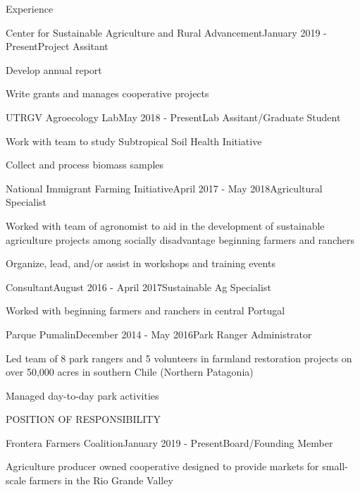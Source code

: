 \documentclass{resume} %
\begin{document}
\begin{rSection}{Experience}

\begin{rSubsection}{Center for Sustainable Agriculture and Rural Advancement}{January 2019 - Present}{Project Assitant}{}
\item Develop annual report
\item Write grants and manages cooperative projects
\end{rSubsection}



\begin{rSubsection}{UTRGV Agroecology Lab}{May 2018 - Present}{Lab Assitant/Graduate Student}{}
\item Work with team to study Subtropical Soil Health Initiative
\item Collect and process biomass samples
\end{rSubsection}

\begin{rSubsection}{National Immigrant Farming Initiative}{April 2017 - May 2018}{Agricultural Specialist}{}
\item Worked with team of agronomist to aid in the development of sustainable agriculture projects among socially disadvantage beginning farmers and ranchers
\item Organize, lead, and/or assist in workshops and training events
\end{rSubsection}

\begin{rSubsection}{Consultant}{August 2016 - April 2017}{Sustainable Ag Specialist}
\item Worked with beginning farmers and ranchers in central Portugal 
\end{rSubsection}


\begin{rSubsection}{Parque Pumalin}{December 2014 - May 2016}{Park Ranger Administrator}{}
\item Led team of 8 park rangers and 5 volunteers in farmland restoration projects on over 50,000 acres in southern Chile (Northern Patagonia)
\item Managed day-to-day park activities 
\end{rSubsection}

\end{rSection}


\begin{rSection}{POSITION OF RESPONSIBILITY}

\begin{rSubsection}{Frontera Farmers Coalition}{January 2019 - Present}{Board/Founding Member}
\item Agriculture producer owned cooperative designed to provide markets for small-scale farmers in the Rio Grande Valley
\end{rSubsection}
\end{rSection}
\end{document}
